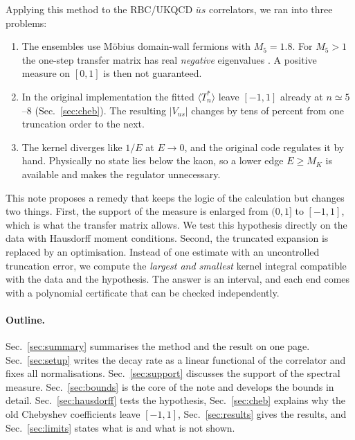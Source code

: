 \documentclass[11pt]{article}
\newcommand{\Vus}{|V_{us}|}
\theoremstyle{remark}
\begin{document}
Applying this method to the RBC/UKQCD $\bar us$ correlators, we ran into three problems:
\begin{enumerate}[leftmargin=*,itemsep=1pt]
\item The ensembles use M\"obius domain-wall fermions with $M_5=1.8$. For $M_5>1$ the one-step transfer matrix has real \emph{negative} eigenvalues \cite{Syritsyn:2007}.
      A positive measure on $[0,1]$ is then not guaranteed.
\item In the original implementation the fitted $\langle T^*_n\rangle$ leave $[-1,1]$ already at $n\simeq5$--$8$ (Sec.~\ref{sec:cheb}). The resulting $\Vus$ changes by tens of percent from one truncation order to the next.
\item The kernel diverges like $1/E$ at $E\to0$, and the original code regulates it by hand. Physically no state lies below the kaon, so a lower edge $E\ge M_K$ is available and makes the regulator unnecessary.
\end{enumerate}

This note proposes a remedy that keeps the logic of the calculation but changes two things. First, the support of the measure is enlarged from $(0,1]$ to $[-1,1]$, which is what the transfer matrix allows.
We test this hypothesis directly on the data with Hausdorff moment conditions. Second, the truncated expansion is replaced by an optimisation. Instead of one estimate with an uncontrolled truncation error,
we compute the \emph{largest and smallest} kernel integral compatible with the data and the hypothesis. The answer is an interval, and each end comes with a polynomial certificate that can be checked independently.

\paragraph{Outline.} Sec.~\ref{sec:summary} summarises the method and the result on one page. Sec.~\ref{sec:setup} writes the decay rate as a linear functional of the correlator and fixes all normalisations.
Sec.~\ref{sec:support} discusses the support of the spectral measure. Sec.~\ref{sec:bounds} is the core of the note and develops the bounds in detail. Sec.~\ref{sec:hausdorff} tests the hypothesis,
Sec.~\ref{sec:cheb} explains why the old Chebyshev coefficients leave $[-1,1]$, Sec.~\ref{sec:results} gives the results, and Sec.~\ref{sec:limits} states what is and what is not shown.
\end{document}
